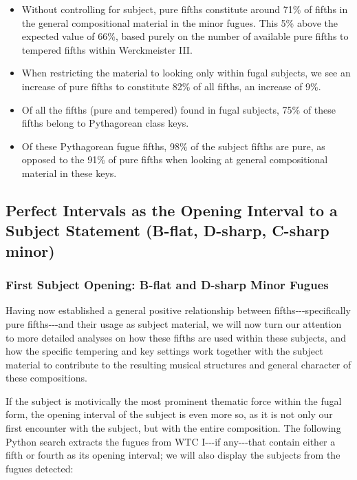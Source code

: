 \begin{itemize}
\tightlist
\item
  Without controlling for subject, pure fifths constitute around 71\% of
  fifths in the general compositional material in the minor fugues. This
  5\% above the expected value of 66\%, based purely on the number of
  available pure fifths to tempered fifths within Werckmeister III.
\item
  When restricting the material to looking only within fugal subjects,
  we see an increase of pure fifths to constitute 82\% of all fifths, an
  increase of 9\%.
\item
  Of all the fifths (pure and tempered) found in fugal subjects, 75\% of
  these fifths belong to Pythagorean class keys.
\item
  Of these Pythagorean fugue fifths, 98\% of the subject fifths are
  pure, as opposed to the 91\% of pure fifths when looking at general
  compositional material in these keys.
\end{itemize}

    \subsection{Perfect Intervals as the Opening Interval to a Subject
Statement (B-flat, D-sharp, C-sharp
minor)}\label{perfect-intervals-as-the-opening-interval-to-a-subject-statement-b-flat-d-sharp-c-sharp-minor}

\subsubsection{First Subject Opening: B-flat and D-sharp Minor
Fugues}\label{first-subject-opening-b-flat-and-d-sharp-minor-fugues}

Having now established a general positive relationship between
fifths-\/-\/-specifically pure fifths-\/-\/-and their usage as subject
material, we will now turn our attention to more detailed analyses on
how these fifths are used within these subjects, and how the specific
tempering and key settings work together with the subject material to
contribute to the resulting musical structures and general character of
these compositions.

If the subject is motivically the most prominent thematic force within
the fugal form, the opening interval of the subject is even more so, as
it is not only our first encounter with the subject, but with the entire
composition. The following Python search extracts the fugues from WTC
I-\/-\/-if any-\/-\/-that contain either a fifth or fourth as its
opening interval; we will also display the subjects from the fugues
detected:

